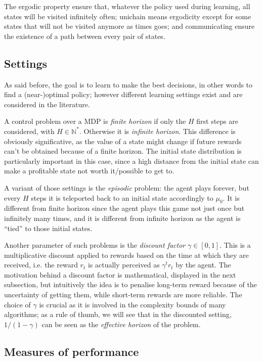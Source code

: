 The ergodic property ensure that, whatever the policy used during learning, all states will be visited infinitely often; unichain means ergodicity except for some states that will not be visited anymore as times goes; and communicating ensure the existence of a path between every pair of states.

\subsection{Settings}
\label{subsec:MDP-settings}

As said before, the goal is to learn to make the best decisions, in other words to find a (near-)optimal policy; however different learning settings exist and are considered in the literature.

A control problem over a MDP is \emph{finite horizon} if only the $H$ first steps are considered, with $H \in \mathbb{N}^*$. Otherwise it is \emph{infinite horizon}. This difference is obviously significative, as the value of a state might change if future rewards can't be obtained because of a finite horizon. The initial state distribution is particularly important in this case, since a high distance from the initial state can make a profitable state not worth it/possible to get to.

A variant of those settings is the \emph{episodic} problem: the agent plays forever, but every $H$ steps it is teleported back to an initial state accordingly to $\mu_0$. It is different from finite horizon since the agent plays this game not just once but infinitely many times, and it is different from infinite horizon as the agent is ``tied'' to those initial states.

Another parameter of such problems is the \emph{discount factor} $\gamma \in [0, 1]$. This is a multiplicative discount applied to rewards based on the time at which they are received, i.e. the reward $r_t$ is actually perceived as $\gamma^t r_t$ by the agent. The motivation behind a discount factor is mathematical, displayed in the next subsection, but intuitively the idea is to penalise long-term reward because of the uncertainty of getting them, while short-term rewards are more reliable. The choice of $\gamma$ is crucial as it is involved in the complexity bounds of many algorithms; as a rule of thumb, we will see that in the discounted setting, $1/(1 - \gamma)$ can be seen as the \emph{effective horizon} of the problem.

\subsection{Measures of performance}
\label{subsec:MDP-measures}

